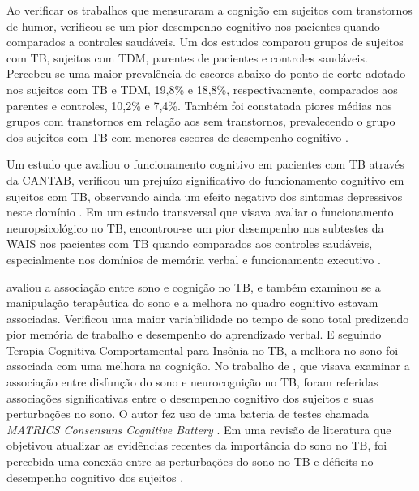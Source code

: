 \documentclass[chapter=TITLE,
               oneside,
               12pt,
               a4paper,
               english,
               brazil]{abntex2}    %
\begin{document}
        Ao verificar os trabalhos que mensuraram a cognição em sujeitos com
        transtornos de humor, verificou-se um pior desempenho cognitivo
        nos pacientes quando comparados a controles saudáveis. Um dos estudos
        comparou grupos de sujeitos com TB, sujeitos com TDM, parentes de
        pacientes e controles saudáveis. Percebeu-se uma maior prevalência
        de escores abaixo do ponto de corte adotado nos sujeitos com TB e
        TDM, 19,8\% e 18,8\%, respectivamente, comparados aos parentes
        e controles, 10,2\% e 7,4\%. Também foi constatada piores médias nos
        grupos com transtornos em relação aos sem transtornos, prevalecendo o
        grupo dos sujeitos com TB com menores escores de desempenho cognitivo
        \parencite{schneider_cognitive_2008,
        bo_comparison_2019}.

        Um estudo que avaliou o funcionamento cognitivo em pacientes com TB através
        da CANTAB, verificou um prejuízo significativo do funcionamento
        cognitivo em sujeitos com TB, observando ainda um efeito negativo
        dos sintomas depressivos neste domínio
        \parencite{van_der_werf-eldering_cognitive_2010}.
        Em um estudo transversal que visava avaliar o funcionamento
        neuropsicológico no TB, encontrou-se um pior desempenho nos
        subtestes da WAIS nos pacientes com TB quando comparados aos controles
        saudáveis, especialmente nos domínios de memória verbal e
        funcionamento executivo
        \parencite{martinez-aran_cognitive_2004}.

        \textcite{kanady_association_2017} avaliou a associação entre sono e
        cognição no TB, e também examinou se a manipulação terapêutica do sono
        e a melhora no quadro cognitivo estavam associadas.
        Verificou uma maior variabilidade no tempo de sono total predizendo
        pior memória de trabalho e desempenho do aprendizado verbal.
        E seguindo Terapia Cognitiva Comportamental para Insônia no TB, a melhora
        no sono foi associada com uma melhora na cognição.
        No trabalho de \textcite{russo_relationship_2015}, que visava examinar
        a associação entre disfunção do sono e neurocognição no TB, foram
        referidas associações significativas entre o desempenho cognitivo dos
        sujeitos e suas perturbações no sono. O autor fez uso de uma bateria
        de testes chamada \textit{MATRICS Consensuns Cognitive Battery}
        \parencite{nuechterlein_matrics_2008,
        bo_use_2017}.
        Em uma revisão de literatura que objetivou atualizar as evidências
        recentes da importância do sono no TB, foi percebida uma conexão
        entre as perturbações do sono no TB e déficits no desempenho
        cognitivo dos sujeitos
        \parencite{kaplan_sleep_2020}.
\end{document}
